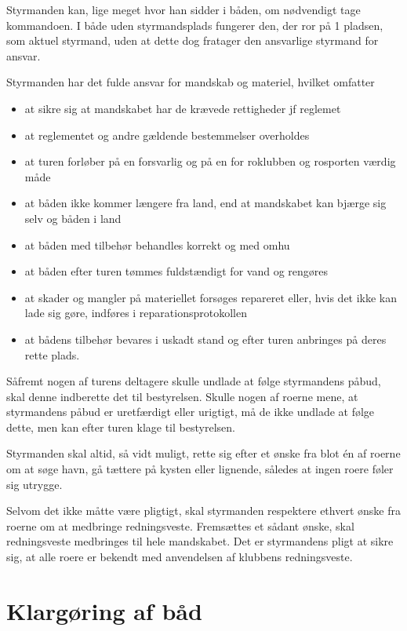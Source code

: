 \documentclass{article}
\begin{document}
Styrmanden kan, lige meget hvor han sidder i båden, om nødvendigt tage
kommandoen. I både uden styrmandsplads fungerer den, der ror på 1
pladsen, som aktuel styrmand, uden at dette dog fratager den ansvarlige
styrmand for ansvar.

Styrmanden har det fulde ansvar for mandskab og materiel, hvilket
omfatter
\begin{itemize}
    \item at sikre sig at mandskabet har de krævede rettigheder jf
        reglemet
    \item at reglementet og andre gældende bestemmelser overholdes
    \item at turen forløber på en forsvarlig og på en for roklubben og
        rosporten værdig måde
    \item at båden ikke kommer længere fra land, end at mandskabet kan
        bjærge sig selv og båden i land
    \item at båden med tilbehør behandles korrekt og med omhu
    \item at båden efter turen tømmes fuldstændigt for vand og rengøres
    \item at skader og mangler på materiellet forsøges repareret eller,
        hvis det ikke kan lade sig gøre, indføres i
        reparationsprotokollen
    \item at bådens tilbehør bevares i uskadt stand og efter turen
        anbringes på deres rette plads.
\end{itemize}

Såfremt nogen af turens deltagere skulle undlade at følge styrmandens
påbud, skal denne indberette det til bestyrelsen. Skulle nogen af roerne
mene, at styrmandens påbud er uretfærdigt eller urigtigt, må de ikke
undlade at følge dette, men kan efter turen klage til bestyrelsen.

Styrmanden skal altid, så vidt muligt, rette sig efter et ønske fra blot
én af roerne om at søge havn, gå tættere på kysten eller lignende,
således at ingen roere føler sig utrygge.

Selvom det ikke måtte være pligtigt, skal styrmanden respektere ethvert
ønske fra roerne om at medbringe redningsveste. Fremsættes et sådant
ønske, skal redningsveste medbringes til hele mandskabet. Det er
styrmandens pligt at sikre sig, at alle roere er bekendt med anvendelsen
af klubbens redningsveste.

\section{Klargøring af båd}
\end{document}
